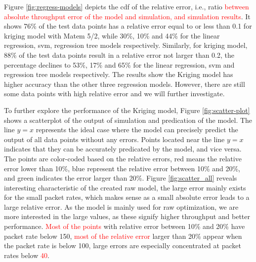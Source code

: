 
Figure \ref{fig:regress-models} depicts the \gls{cdf} of the relative error, i.e., ratio \textcolor{red}{between absolute throughput error of the model and simulation,  and simulation results}.
It shows 76\% of the test data points has a relative error equal to or less than 0.1 for kriging model with Matem 5/2, while 30\%, 10\% and 44\% for the linear regression, \gls{svm}, regression tree models respectively. Similarly,  for kriging model, 88\% of the test data points result in  a relative error not larger than 0.2, the percentage declines to 53\%, 17\% and 65\% for the linear regression, \gls{svm} and regression tree models respectively. The results show the Kriging model has higher accuracy than the other three regression models. However, there are still some data points with high relative error and we will further investigate. 


To further explore the performance of the Kriging model, Figure \ref{fig:scatter-plot}  shows a scatterplot of the output of simulation and predication of the model.
The line  $y=x$ represents the ideal case where the model can precisely predict the output of all data points without any errors. Points located near the line $y=x$ indicates that they can be accurately predicated by the model, and vice versa. The points are color-coded based on the relative errors, red means the relative error lower than 10\%, blue represent the relative error between 10\% and 20\%, and green indicates the error larger than 20\%. Figure \ref{fig:scatter_all} reveals interesting characteristic of the created \gls{raw} model, the large error mainly exists for the small packet rates, which makes sense as a small absolute error leads to a large relative error. As the model is mainly used for \gls{raw} optimization, we are more interested in the large values, as these signify higher throughput and better performance. \textcolor{red}{Most of the points} with relative error between 10\% and 20\%  have packet rate below 150, \textcolor{red}{most of the relative error} larger than 20\% appear when the packet rate is below 100, large errors are especially concentrated at packet rates below \textcolor{red}{40}. 

